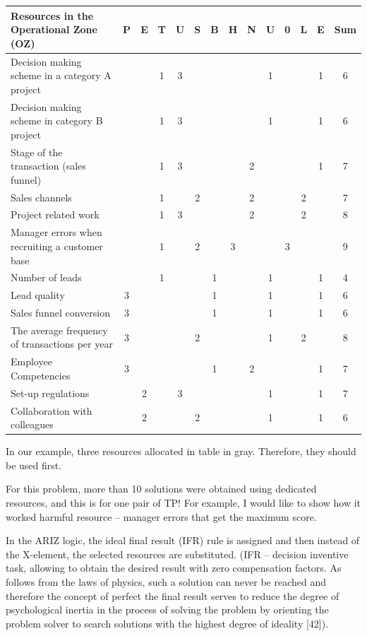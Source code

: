 \documentclass[11pt,a4paper]{book}
\begin{document}
\begin{center}
  \begin{tabular}{|p{5cm}|*{3}{c|}|*{3}{c|}|*{3}{c|}|*{3}{c|}|c|}\hline
    \textbf{Resources in the Operational Zone (OZ)}
    &P&E&T&U&S&B&H&N&U&0&L&E&Sum\\\hline
 Decision making scheme in a category A project&&&1&3&&&&&1&&&1&6\\
 Decision making scheme in category B project  &&&1&3&&&&&1&&&1&6\\
 Stage of the transaction (sales funnel)       &&&1&3&&&&2&&&&1&7\\
 Sales channels                                &&&1&&2&&&2&&&2&&7\\
 Project related work                          &&&1&3&&&&2&&&2&&8\\
 Manager errors when recruiting a customer base&&&1&&2&&3&&&3&&&9\\
 Number of leads                               &&&1&&&1&&&1&&&1&4\\
 Lead quality                                  &3&&&&&1&&&1&&&1&6\\
 Sales funnel conversion                       &3&&&&&1&&&1&&&1&6\\
 The average frequency of transactions per year&3&&&&2&&&&1&&2&&8\\
 Employee Competencies                         &3&&&&&1&&2&&&&1&7\\
 Set-up regulations                            &&2&&3&&&&&1&&&1&7\\
 Collaboration with colleagues                 &&2&&&2&&&&1&&&1&6\\\hline
  \end{tabular}
\end{center}

In our example, three resources allocated in table in gray. Therefore, they
should be used first.

For this problem, more than 10 solutions were obtained using dedicated
resources, and this is for one pair of TP! For example, I would like to show
how it worked harmful resource -- manager errors that get the maximum score.

In the ARIZ logic, the ideal final result (IFR) rule is assigned and then
instead of the X-element, the selected resources are substituted. (IFR --
decision inventive task, allowing to obtain the desired result with zero
compensation factors. As follows from the laws of physics, such a solution can
never be reached and therefore the concept of perfect the final result serves
to reduce the degree of psychological inertia in the process of solving the
problem by orienting the problem solver to search solutions with the highest
degree of ideality [42]).
\end{document}
